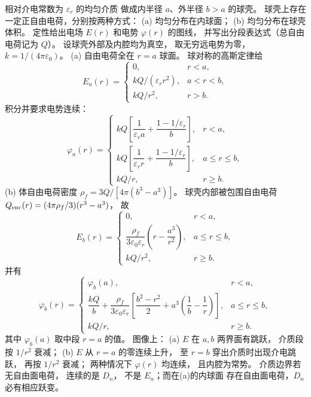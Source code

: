 相对介电常数为 $\varepsilon_r$ 的均匀介质
做成内半径 $a$、外半径 $b>a$ 的球壳。
球壳上存在一定正自由电荷，分别按两种方式：
(a) 均匀分布在内球面；
(b) 均匀分布在球壳体积。
定性给出电场 $E(r)$ 和电势 $\varphi(r)$ 的图线，
并写出分段表达式（总自由电荷记为 $Q$）。
\exsolution
设球壳外部及内腔均为真空，
取无穷远电势为零，
$k=1/(4\pi\varepsilon_0)$。
(a) 自由电荷全在 $r=a$ 球面。
球对称的高斯定律给
\[
\boxed{E_a(r)=
\begin{cases}
0,&r<a,\\
kQ/(\varepsilon_r r^2),&a<r<b,\\
kQ/r^2,&r>b.
\end{cases}}
\]
积分并要求电势连续：
\[
\boxed{\varphi_a(r)=
\begin{cases}
kQ\!\left[\dfrac1{\varepsilon_r a}
+\dfrac{1-1/\varepsilon_r}{b}\right],&r<a,\\
kQ\!\left[\dfrac1{\varepsilon_r r}
+\dfrac{1-1/\varepsilon_r}{b}\right],&a\le r\le b,\\
kQ/r,&r\ge b.
\end{cases}}
\]
(b) 体自由电荷密度
$\rho_f=3Q/[4\pi(b^3-a^3)]$。
球壳内部被包围自由电荷
$Q_{\rm enc}(r)=(4\pi\rho_f/3)(r^3-a^3)$，
故
\[
\boxed{E_b(r)=
\begin{cases}
0,&r<a,\\
\dfrac{\rho_f}{3\varepsilon_0\varepsilon_r}
\left(r-\dfrac{a^3}{r^2}\right),&a\le r\le b,\\
kQ/r^2,&r\ge b.
\end{cases}}
\]
并有
\[
\boxed{\varphi_b(r)=
\begin{cases}
\varphi_b(a),&r<a,\\
\dfrac{kQ}{b}+
\dfrac{\rho_f}{3\varepsilon_0\varepsilon_r}
\left[\dfrac{b^2-r^2}{2}
+a^3\left(\dfrac1b-\dfrac1r\right)\right],
&a\le r\le b,\\
kQ/r,&r\ge b.
\end{cases}}
\]
其中 $\varphi_b(a)$ 取中段 $r=a$ 的值。
图像上：
(a) $E$ 在 $a,b$ 两界面有跳跃，
介质段按 $1/r^2$ 衰减；
(b) $E$ 从 $r=a$ 的零连续上升，
至 $r=b$ 穿出介质时出现介电跳跃，
再按 $1/r^2$ 衰减；
两种情况下 $\varphi(r)$ 均连续，
且内腔为常势。
\excheck 介质边界若无自由面电荷，
连续的是 $D_n$，
不是 $E_n$；而在(a)的内球面
存在自由面电荷，$D_n$ 必有相应跃变。


